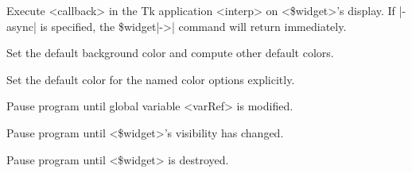 \begin{enum}{1cm}
Execute <callback> in the Tk application <interp> on <\$widget>'s display.
If |-async| is specified, the \$widget|->| command will return immediately.

Set the default background color and compute other default colors.

Set the default color for the named color options explicitly.

Pause program until global variable <varRef> is modified.

Pause program until <\$widget>'s visibility has changed.

Pause program until <\$widget> is destroyed.
 
\end{enum}

